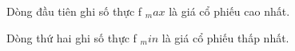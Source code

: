 Dòng đầu tiên ghi số thực f $_ max $ là giá cổ phiếu cao nhất.

Dòng thứ hai ghi số thực f $_ min $ là giá cổ phiếu thấp nhất.